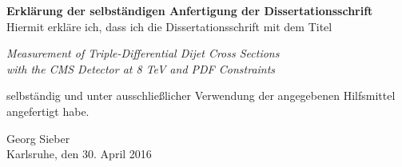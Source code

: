 \cleardoublepage
\thispagestyle{empty}
\null\vspace{10cm}
\noindent
{\sffamily \textbf{Erklärung der selbständigen Anfertigung der
Dissertationsschrift}}\\[1cm]

\noindent
Hiermit erkläre ich, dass ich die Dissertationsschrift mit dem Titel
%
\begin{center}
 \guillemotright
 \textit{Measurement of Triple-Differential Dijet Cross Sections\\
            with the CMS Detector at 8 TeV and PDF Constraints}\guillemotleft\\[1.5ex]

\end{center}
%
selbständig und unter ausschließlicher Verwendung der angegebenen Hilfsmittel\\
angefertigt habe.
\vspace{12ex}

\noindent
\hrulefill\hspace{9cm}

\noindent
Georg Sieber\\
\noindent
Karlsruhe, den 30. April 2016


